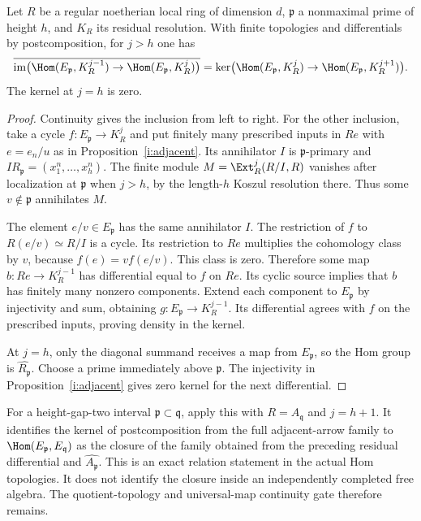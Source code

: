 \begin{proposition}\label{i:closedexact}
Let $R$ be a regular noetherian local ring of dimension $d$,
$\mathfrak p$ a nonmaximal prime of height $h$, and $K_R$ its
residual resolution. With finite topologies and differentials by
postcomposition, for $j>h$ one has
\[
 \overline{\operatorname{im}\bigl(
  \Hom(E_{\mathfrak p},K_R^{j-1})\to
  \Hom(E_{\mathfrak p},K_R^j)\bigr)}
 =\ker\bigl(\Hom(E_{\mathfrak p},K_R^j)\to
             \Hom(E_{\mathfrak p},K_R^{j+1})\bigr).
\]
The kernel at $j=h$ is zero.
\end{proposition}
\begin{proof}
Continuity gives the inclusion from left to right. For the other
inclusion, take a cycle $f:E_{\mathfrak p}\to K_R^j$ and put
finitely many prescribed inputs in $Re$ with $e=e_n/u$ as in
Proposition~\ref{i:adjacent}. Its annihilator $I$ is
$\mathfrak p$-primary and
$I R_{\mathfrak p}=(x_1^n,\ldots,x_h^n)$.
The finite module $M=\Ext_R^j(R/I,R)$ vanishes after localization
at $\mathfrak p$ when $j>h$, by the length-$h$ Koszul resolution
there. Thus some $v\notin\mathfrak p$ annihilates $M$.

The element $e/v\in E_{\mathfrak p}$ has the same annihilator
$I$. The restriction of $f$ to $R(e/v)\simeq R/I$ is a cycle.
Its restriction to $Re$ multiplies the cohomology class by $v$,
because $f(e)=v f(e/v)$. This class is zero. Therefore some map
$b:Re\to K_R^{j-1}$ has differential equal to $f$ on $Re$.
Its cyclic source implies that $b$ has finitely many nonzero
components. Extend each component to $E_{\mathfrak p}$ by
injectivity and sum, obtaining
$g:E_{\mathfrak p}\to K_R^{j-1}$. Its differential agrees with
$f$ on the prescribed inputs, proving density in the kernel.

At $j=h$, only the diagonal summand receives a map from
$E_{\mathfrak p}$, so the Hom group is $\widehat{R_{\mathfrak p}}$.
Choose a prime immediately above $\mathfrak p$. The injectivity
in Proposition~\ref{i:adjacent} gives zero kernel for the next
differential.
\end{proof}

For a height-gap-two interval $\mathfrak p\subset\mathfrak q$,
apply this with $R=A_{\mathfrak q}$ and $j=h+1$. It identifies
the kernel of postcomposition from the full adjacent-arrow family
to $\Hom(E_{\mathfrak p},E_{\mathfrak q})$ as the closure of
the family obtained from the preceding residual differential and
$\widehat{A_{\mathfrak p}}$. This is an exact relation statement
in the actual Hom topologies. It does not identify the closure
inside an independently completed free algebra. The quotient-topology
and universal-map continuity gate therefore remains.
